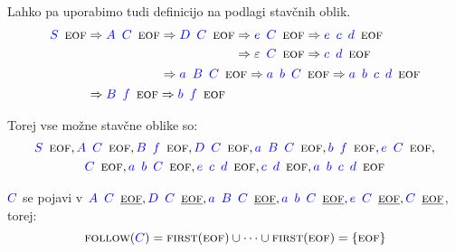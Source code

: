 \documentclass{article}
\newcommand{\FIRST}{\textsc{first}}
\newcommand{\FOLLOW}{\textsc{follow}}
\newcommand{\EOF}{\textsc{eof}}
\newcommand{\Symbol}[1]{\textcolor{blue}{#1}}
\newcommand{\Null}{\varepsilon}
\newcommand{\Derive}{\Rightarrow}
\newcommand{\Seq}{{\ \,}}
\begin{document}
Lahko pa uporabimo tudi definicijo na podlagi stavčnih oblik.
\begin{equation*}
  \Symbol{S} \Seq \EOF \begin{aligned}[t]
    &\Derive \Symbol{A} \Seq \Symbol{C} \Seq \EOF \begin{aligned}[t]
      &\Derive \Symbol{D} \Seq \Symbol{C} \Seq \EOF \begin{aligned}[t]
        &\Derive \Symbol{e} \Seq \Symbol{C} \Seq \EOF \Derive \Symbol{e} \Seq \Symbol{c} \Seq \Symbol{d} \Seq \EOF \\
        &\Derive \Null \Seq \Symbol{C} \Seq \EOF \Derive \Symbol{c} \Seq \Symbol{d} \Seq \EOF \\
      \end{aligned}\\
      &\Derive \Symbol{a} \Seq \Symbol{B} \Seq \Symbol{C} \Seq \EOF \Derive \Symbol{a} \Seq \Symbol{b} \Seq \Symbol{C} \Seq \EOF \Derive \Symbol{a} \Seq \Symbol{b} \Seq \Symbol{c} \Seq \Symbol{d} \Seq \EOF
    \end{aligned}\\
    &\Derive \Symbol{B} \Seq \Symbol{f} \Seq \EOF \Derive \Symbol{b} \Seq \Symbol{f} \Seq \EOF
  \end{aligned}
\end{equation*}

Torej vse možne stavčne oblike so:
\begin{multline*}
  \Symbol{S} \Seq \EOF, \Symbol{A} \Seq \Symbol{C} \Seq \EOF, \Symbol{B} \Seq \Symbol{f} \Seq \EOF, \Symbol{D} \Seq \Symbol{C} \Seq \EOF, \Symbol{a} \Seq \Symbol{B} \Seq \Symbol{C} \Seq \EOF, \Symbol{b} \Seq \Symbol{f} \Seq \EOF, \Symbol{e} \Seq \Symbol{C} \Seq \EOF,\\ \Symbol{C} \Seq \EOF, \Symbol{a} \Seq \Symbol{b} \Seq \Symbol{C} \Seq \EOF, \Symbol{e} \Seq \Symbol{c} \Seq \Symbol{d} \Seq \EOF, \Symbol{c} \Seq \Symbol{d} \Seq \EOF, \Symbol{a} \Seq \Symbol{b} \Seq \Symbol{c} \Seq \Symbol{d} \Seq \EOF
\end{multline*}

$\Symbol{C}$ se pojavi v $\Symbol{A} \Seq \Symbol{C} \Seq \underline{\EOF}, \Symbol{D} \Seq \Symbol{C} \Seq \underline{\EOF}, \Symbol{a} \Seq \Symbol{B} \Seq \Symbol{C} \Seq \underline{\EOF}, \Symbol{a} \Seq \Symbol{b} \Seq \Symbol{C} \Seq \underline{\EOF}, \Symbol{e} \Seq \Symbol{C} \Seq \underline{\EOF}, \Symbol{C} \Seq \underline{\EOF}$, torej:
\begin{equation*}
  \FOLLOW(\Symbol{C}) = \FIRST(\EOF) \cup \dots \cup \FIRST(\EOF) = \{\EOF\}
\end{equation*}
\end{document}
